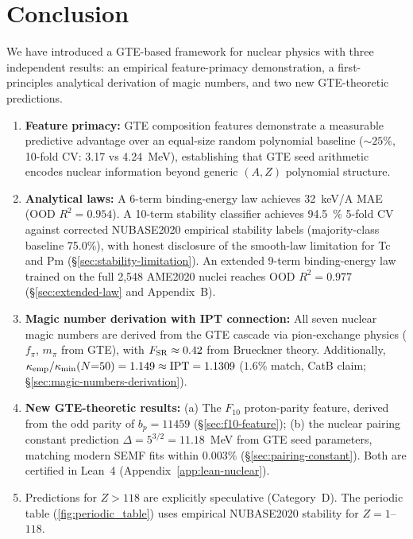 \documentclass[9pt,twocolumn]{extarticle}
\begin{document}
\section{Conclusion}
We have introduced a GTE-based framework for nuclear physics with three independent results: an empirical feature-primacy demonstration, a first-principles analytical derivation of magic numbers, and two new GTE-theoretic predictions.
\begin{enumerate}[leftmargin=1.2em,itemsep=0.2em]
    \item \textbf{Feature primacy:} GTE composition features demonstrate a measurable predictive advantage over an equal-size random polynomial baseline ($\sim\!25\%$, 10-fold CV: 3.17 vs 4.24~MeV), establishing that GTE seed arithmetic encodes nuclear information beyond generic $(A,Z)$ polynomial structure.
    \item \textbf{Analytical laws:} A 6-term binding-energy law achieves \SI{32}{\kilo\electronvolt/A} MAE (OOD $R^2=0.954$). A 10-term stability classifier achieves \SI{94.5}{\percent} 5-fold CV against corrected NUBASE2020 empirical stability labels (majority-class baseline 75.0\%), with honest disclosure of the smooth-law limitation for Tc and Pm (\S\ref{sec:stability-limitation}). An extended 9-term binding-energy law trained on the full 2,548 AME2020 nuclei reaches OOD $R^2=0.977$ (\S\ref{sec:extended-law} and Appendix~B).
    \item \textbf{Magic number derivation with IPT connection:} All seven nuclear magic numbers are derived from the GTE cascade via pion-exchange physics ($f_\pi$, $m_\pi$ from GTE), with $F_{\rm SR} \approx 0.42$ from Brueckner theory. Additionally, $\kappa_{\rm emp}/\kappa_{\rm min}(N{=}50) = 1.149 \approx \mathrm{IPT} = 1.1309$ ($1.6\%$ match, CatB claim; \S\ref{sec:magic-numbers-derivation}).
    \item \textbf{New GTE-theoretic results:} (a) The $F_{10}$ proton-parity feature, derived from the odd parity of $b_p = 11459$ (\S\ref{sec:f10-feature}); (b) the nuclear pairing constant prediction $\Delta = 5^{3/2} = 11.18$~MeV from GTE seed parameters, matching modern SEMF fits within $0.003\%$ (\S\ref{sec:pairing-constant}). Both are certified in Lean~4 (Appendix~\ref{app:lean-nuclear}).
    \item Predictions for $Z>118$ are explicitly speculative (Category~D). The periodic table (\cref{fig:periodic_table}) uses empirical NUBASE2020 stability for $Z=1$--$118$.
\end{enumerate}
\end{document}
